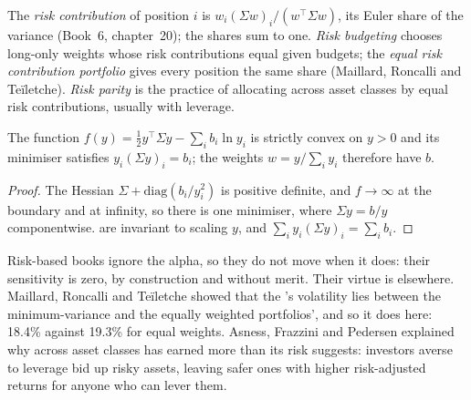 \begin{definition}\label{def:rs:portfolio-construction-ii:erc}
The \emph{risk contribution} of position $i$ is $w_i(\Sigma w)_i/(w^\top\Sigma w)$, its Euler share of the variance (Book~6, chapter~20);
the shares sum to one. \emph{Risk budgeting} chooses long-only weights whose risk contributions equal given budgets; the \emph{equal risk
contribution portfolio} gives every position the same share (Maillard, Roncalli and Teïletche). \emph{Risk
parity} is the practice of allocating across asset classes by equal risk contributions, usually with leverage.
\end{definition}

\begin{proposition}\label{prop:rs:portfolio-construction-ii:budget}
The function $f(y) = \frac12 y^\top\Sigma y - \sum_i b_i\ln y_i$ is strictly convex on $y > 0$ and its minimiser satisfies $y_i(\Sigma y)_i = b_i$; the weights
$w = y/\sum_i y_i$ therefore have  $b$.
\end{proposition}

\begin{proof}
The Hessian $\Sigma + \mathrm{diag}(b_i/y_i^2)$ is positive definite, and $f \to \infty$ at the boundary and at infinity, so there is one minimiser, where
$\Sigma y = b/y$ componentwise.  are invariant to scaling $y$, and $\sum_i y_i(\Sigma y)_i = \sum_i b_i$.
\end{proof}

Risk-based books ignore the alpha, so they do not move when it does: their sensitivity is zero, by construction and without merit. Their virtue is elsewhere.
Maillard, Roncalli and Teïletche showed that the 's volatility lies between the minimum-variance and the equally weighted
portfolios', and so it does here: 18.4\% against 19.3\% for equal weights. Asness, Frazzini and Pedersen explained why  across asset classes has
earned more than its risk suggests: investors averse to leverage bid up risky assets, leaving safer ones with higher risk-adjusted returns for anyone who can
lever them.

